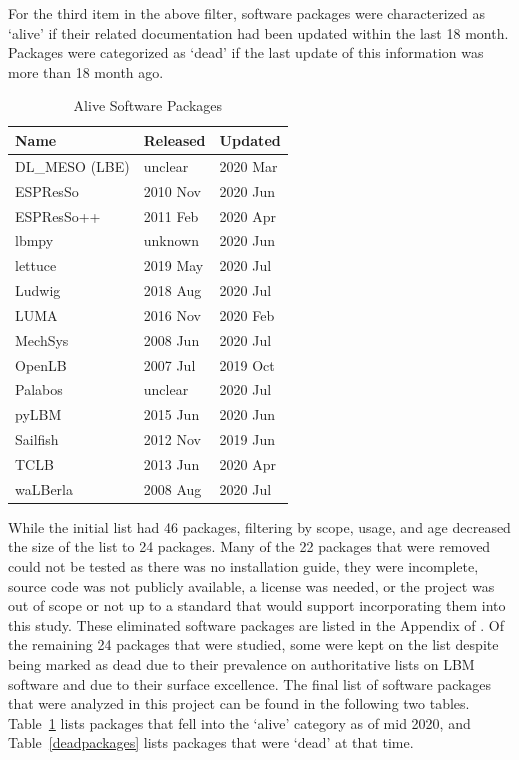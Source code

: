 \documentclass[final, 3p, times, authoryear]{elsarticle}
\begin{document}
For the third item in the above filter, software packages were characterized as
`alive' if their related documentation had been updated within the last 18
month. Packages were categorized as `dead' if the last update of this
information was more than 18 month ago.

\begin{table}
\begin{center}
	\begin{tabular}{ p{4cm}p{3cm}p{3cm} }
		\hline
		Name & Released & Updated\\
		\hline
		DL\_MESO (LBE) & unclear & 2020 Mar\\
		ESPResSo & 2010 Nov & 2020 Jun\\
		ESPResSo++ & 2011 Feb & 2020 Apr\\
		lbmpy& unknown  & 2020 Jun  \\
		lettuce & 2019 May & 2020 Jul\\
		Ludwig& 2018 Aug & 2020 Jul\\
		LUMA& 2016 Nov   & 2020 Feb\\
		MechSys & 2008 Jun    & 2020 Jul\\
		OpenLB & 2007 Jul & 2019 Oct\\
		Palabos & unclear & 2020 Jul\\
		pyLBM & 2015 Jun&   2020 Jun\\
		Sailfish & 2012 Nov & 2019 Jun\\
		TCLB & 2013 Jun  & 2020 Apr\\
		waLBerla & 2008 Aug & 2020 Jul\\
		\hline
	\end{tabular}
	\caption{Alive Software Packages} \label{alivepackages}
\end{center}
\end{table}

While the initial list had 46 packages, filtering by scope, usage, and age
decreased the size of the list to 24 packages. Many of the 22 packages that were
removed could not be tested as there was no installation guide, they were
incomplete, source code was not publicly available, a license was needed, or the
project was out of scope or not up to a standard that would support
incorporating them into this study. These eliminated software packages are
listed in the Appendix of \citet{Michalski2021}. Of the remaining 24 packages
that were studied, some were kept on the list despite being marked as dead due
to their prevalence on authoritative lists on LBM software and due to their
surface excellence.  The final list of software packages that were analyzed in
this project can be found in the following two tables. Table~\ref{alivepackages}
lists packages that fell into the `alive' category as of mid 2020, and
Table~\ref{deadpackages} lists packages that were `dead' at that time.
\end{document}

